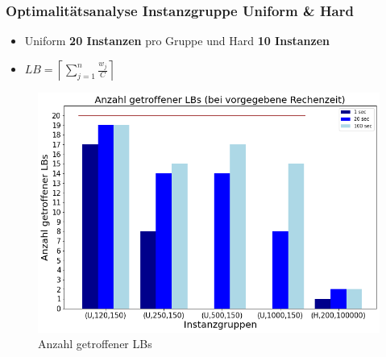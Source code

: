 \documentclass{beamer}
\begin{document}




\begin{frame}

\frametitle{Optimalitätsanalyse Instanzgruppe Uniform \& Hard}
\begin{footnotesize}
\begin{itemize}
\item Uniform \textbf{20 Instanzen} pro Gruppe und Hard \textbf{10 Instanzen}
\item $LB = \left\lceil\sum_{j=1}^{n} \frac{w_j}{C}\right\rceil$
\end{itemize}
\end{footnotesize}


\begin{figure}[!htbp]
\begin{center}
\includegraphics[scale=0.3]{img/lb_unif_hard.png}
\end{center}
\caption{Anzahl getroffener LBs}
\label{fig:LBs}
\end{figure}



\end{frame}
\end{document}
